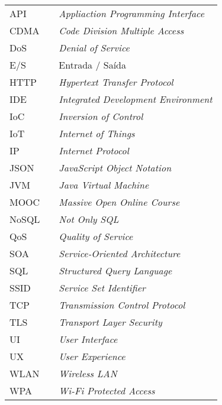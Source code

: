 \begin{table}[H]
\centering
\label{my-label}
\begin{tabular}{lll}
API   &  & \textit{Appliaction Programming Interface}                \\
CDMA  &  & \textit{Code Division Multiple Access}                    \\
DoS   &  & \textit{Denial of Service}                                \\
E/S   &  & Entrada / Saída                                           \\
HTTP  &  & \textit{Hypertext Transfer Protocol}                      \\
IDE   &  & \textit{Integrated Development Environment}               \\
IoC   &  & \textit{Inversion of Control}                             \\
IoT   &  & \textit{Internet of Things}                               \\
IP    &  & \textit{Internet Protocol}                                \\
JSON  &  & \textit{JavaScript Object Notation}                       \\
JVM   &  & \textit{Java Virtual Machine}                             \\
MOOC  &  & \textit{Massive Open Online Course}                       \\
NoSQL &  & \textit{Not Only SQL}                                     \\
QoS   &  & \textit{Quality of Service}                               \\
SOA   &  & \textit{Service-Oriented Architecture}                    \\
SQL   &  & \textit{Structured Query Language}                        \\
SSID  &  & \textit{Service Set Identifier}                           \\
TCP   &  & \textit{Transmission Control Protocol}                    \\
TLS   &  & \textit{Transport Layer Security}                         \\
UI    &  & \textit{User Interface}                                   \\
UX    &  & \textit{User Experience}                                  \\
WLAN  &  & \textit{Wireless LAN}                                     \\
WPA   &  & \textit{Wi-Fi Protected Access}
\end{tabular}
\end{table}
